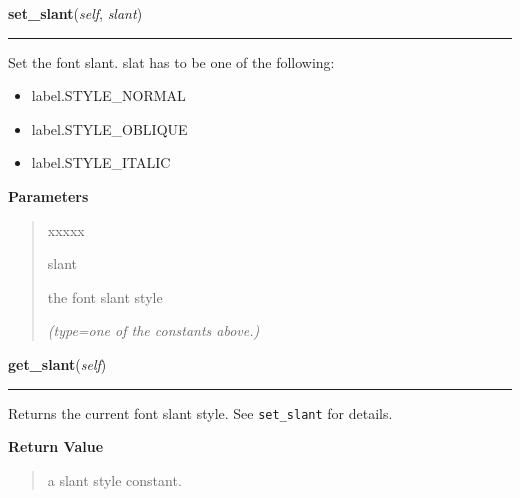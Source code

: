\hspace{.8\funcindent}\begin{boxedminipage}{\funcwidth}

    \raggedright \textbf{set\_slant}(\textit{self}, \textit{slant})

    \vspace{-1.5ex}

    \rule{\textwidth}{0.5\fboxrule}
\setlength{\parskip}{2ex}
    Set the font slant. slat has to be one of the following:

    \begin{itemize}
    \setlength{\parskip}{0.6ex}
      \item label.STYLE\_NORMAL

      \item label.STYLE\_OBLIQUE

      \item label.STYLE\_ITALIC

    \end{itemize}

\setlength{\parskip}{1ex}
      \textbf{Parameters}
      \vspace{-1ex}

      \begin{quote}
        \begin{Ventry}{xxxxx}

          \item[slant]

          the font slant style

            {\it (type=one of the constants above.)}

        \end{Ventry}

      \end{quote}

    \end{boxedminipage}

    \label{pygtk_chart:label:Label:get_slant}

    \vspace{0.5ex}

\hspace{.8\funcindent}\begin{boxedminipage}{\funcwidth}

    \raggedright \textbf{get\_slant}(\textit{self})

    \vspace{-1.5ex}

    \rule{\textwidth}{0.5\fboxrule}
\setlength{\parskip}{2ex}
    Returns the current font slant style. See \texttt{set\_slant} for 
    details.

\setlength{\parskip}{1ex}
      \textbf{Return Value}
    \vspace{-1ex}

      \begin{quote}
      a slant style constant.

      \end{quote}

    \end{boxedminipage}

